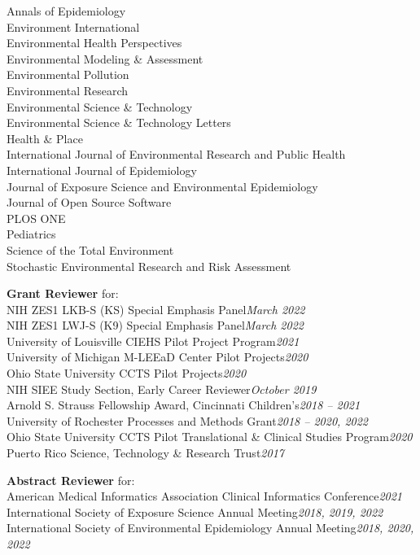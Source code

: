 \documentclass[margin,line]{res}
\newenvironment{list3}{
  \begin{list}{}{%
      \setlength{\itemsep}{0in}
      \setlength{\parsep}{0in} \setlength{\parskip}{0in}
      \setlength{\topsep}{0in} \setlength{\partopsep}{0in}
      \setlength{\leftmargin}{0in}}}{\end{list}}
\begin{document}
\begin{resume}
\begin{list3}
        Annals of Epidemiology \\
        Environment International \\
        Environmental Health Perspectives \\
        Environmental Modeling \& Assessment \\
        Environmental Pollution \\
        Environmental Research \\
        Environmental Science \& Technology \\
        Environmental Science \& Technology Letters\\
        Health \& Place \\
        International Journal of Environmental Research and Public Health \\
        International Journal of Epidemiology \\
        Journal of Exposure Science and Environmental Epidemiology \\
        Journal of Open Source Software \\
        PLOS ONE \\
        Pediatrics \\
        Science of the Total Environment \\
        Stochastic Environmental Research and Risk Assessment
\item[] \textbf{Grant Reviewer} for: \\
        NIH ZES1 LKB-S (KS) Special Emphasis Panel\hfill \textit{March 2022}\\
        NIH ZES1 LWJ-S (K9) Special Emphasis Panel\hfill \textit{March 2022}\\
        University of Louisville CIEHS Pilot Project Program\hfill \textit{2021}\\
        University of Michigan M-LEEaD Center Pilot Projects\hfill \textit{2020}\\
        Ohio State University CCTS Pilot Projects\hfill \textit{2020}\\
        NIH SIEE Study Section, Early Career Reviewer\hfill \textit{October 2019}\\
        Arnold S. Strauss Fellowship Award, Cincinnati Children's\hfill \textit{2018 -- 2021}\\
        University of Rochester Processes and Methods Grant\hfill \textit{2018
          -- 2020, 2022}\\
        Ohio State University CCTS Pilot Translational \& Clinical Studies
        Program\hfill \textit{2020}\\
        Puerto Rico Science, Technology \& Research Trust\hfill \textit{2017}
\item[] \textbf{Abstract Reviewer} for: \\
        American Medical Informatics Association Clinical Informatics Conference\hfill \textit{2021}\\
        International Society of Exposure Science Annual Meeting\hfill \textit{2018, 2019, 2022}\\
        International Society of Environmental Epidemiology Annual Meeting\hfill \textit{2018, 2020, 2022}
\end{list3}


\end{resume}
\end{document}
